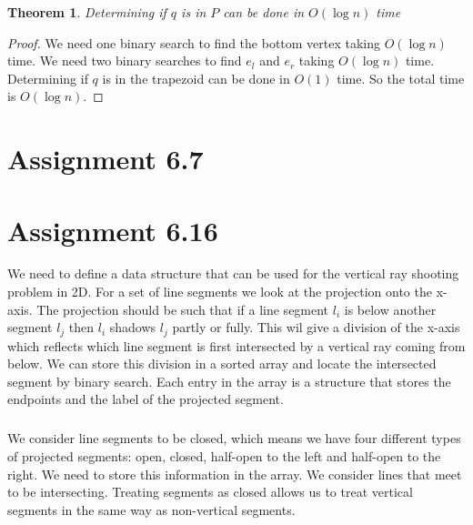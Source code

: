 \documentclass[10pt,a4paper,final,oneside,openany,article]{memoir}
\newtheorem{pinQtime}[pinQ]{Theorem}
\begin{document}
\begin{pinQtime}
  Determining if $q$ is in $P$ can be done in $O(\log n)$ time
\end{pinQtime}

\begin{proof}
  We need one binary search to find the bottom vertex taking $O(\log n)$ time. We need two binary searches to find $e_l$ and $e_r$ taking $O(\log n)$ time. Determining if $q$ is in the trapezoid can be done in $O(1)$ time. So the total time is $O(\log n)$.
\end{proof}

\chapter*{Assignment 6.7}

\chapter*{Assignment 6.16}
We need to define a data structure that can be used for the vertical ray shooting problem in 2D. For a set of line segments we look at the projection onto the x-axis. The projection should be such that if a line segment $l_i$ is below another segment $l_j$ then $l_i$ shadows $l_j$ partly or fully. This wil give a division of the x-axis which reflects which line segment is first intersected by a vertical ray coming from below. We can store this division in a sorted array and locate the intersected segment by binary search. Each entry in the array is a structure that stores the endpoints and the label of the projected segment.

\paragraph{}
We consider line segments to be closed, which means we have four different types of projected segments: open, closed, half-open to the left and half-open to the right. We need to store this information in the array. We consider lines that meet to be intersecting. Treating segments as closed allows us to treat vertical segments in the same way as non-vertical segments.
\end{document}
